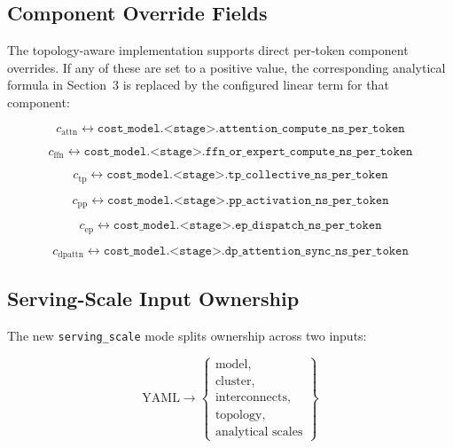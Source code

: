 \subsection{Component Override Fields}

The topology-aware implementation supports direct per-token component overrides.
If any of these are set to a positive value, the corresponding analytical
formula in Section~3 is replaced by the configured linear term for that
component:

\begin{equation*}
c_{\mathrm{attn}} \leftrightarrow
\texttt{cost\_model.<stage>.attention\_compute\_ns\_per\_token}
\end{equation*}

\begin{equation*}
c_{\mathrm{ffn}} \leftrightarrow
\texttt{cost\_model.<stage>.ffn\_or\_expert\_compute\_ns\_per\_token}
\end{equation*}

\begin{equation*}
c_{\mathrm{tp}} \leftrightarrow
\texttt{cost\_model.<stage>.tp\_collective\_ns\_per\_token}
\end{equation*}

\begin{equation*}
c_{\mathrm{pp}} \leftrightarrow
\texttt{cost\_model.<stage>.pp\_activation\_ns\_per\_token}
\end{equation*}

\begin{equation*}
c_{\mathrm{ep}} \leftrightarrow
\texttt{cost\_model.<stage>.ep\_dispatch\_ns\_per\_token}
\end{equation*}

\begin{equation*}
c_{\mathrm{dpattn}} \leftrightarrow
\texttt{cost\_model.<stage>.dp\_attention\_sync\_ns\_per\_token}
\end{equation*}

\subsection{Serving-Scale Input Ownership}

The new \texttt{serving\_scale} mode splits ownership across two inputs:

\begin{equation*}
\text{YAML} \rightarrow
\left\{
\begin{array}{l}
\text{model}, \\
\text{cluster}, \\
\text{interconnects}, \\
\text{topology}, \\
\text{analytical scales}
\end{array}
\right\}
\end{equation*}

